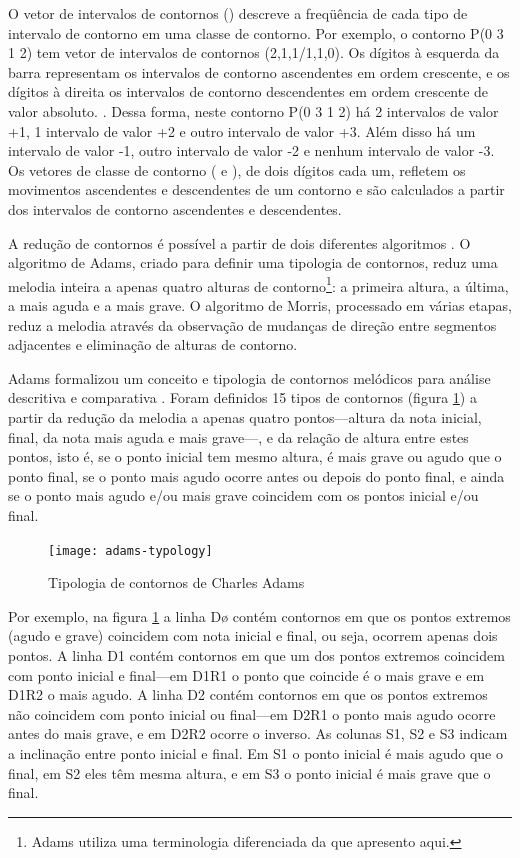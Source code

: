 O vetor de intervalos de contornos () descreve a freqüência de
cada tipo de intervalo de contorno em uma classe de contorno. Por
exemplo, o contorno P(0 3 1 2) tem vetor de intervalos de contornos
(2,1,1/1,1,0). Os dígitos à esquerda da barra representam os
intervalos de contorno ascendentes em ordem crescente, e os dígitos à
direita os intervalos de contorno descendentes em ordem crescente de
valor absoluto. \cite{friedmann85:methodology}. Dessa forma, neste
contorno P(0 3 1 2) há 2 intervalos de valor +1, 1 intervalo de valor
+2 e outro intervalo de valor +3. Além disso há um intervalo de valor
-1, outro intervalo de valor -2 e nenhum intervalo de valor -3. Os
vetores de classe de contorno ( e ), de dois
dígitos cada um, refletem os movimentos ascendentes e descendentes de
um contorno e são calculados a partir dos intervalos de contorno
ascendentes e descendentes.

A redução de contornos é possível a partir de dois diferentes
algoritmos \cite{adams76:melodic,morris93:directions}. O algoritmo de
Adams, criado para definir uma tipologia de contornos, reduz uma
melodia inteira a apenas quatro alturas de contorno\footnote{Adams
  utiliza uma terminologia diferenciada da que apresento aqui.}: a
primeira altura, a última, a mais aguda e a mais grave. O algoritmo de
Morris, processado em várias etapas, reduz a melodia através da
observação de mudanças de direção entre segmentos adjacentes e
eliminação de alturas de contorno.

Adams formalizou um conceito e tipologia de contornos melódicos para
análise descritiva e comparativa \cite{adams76:melodic}. Foram
definidos 15 tipos de contornos (figura \ref{fig:adams-typology}) a
partir da redução da melodia a apenas quatro pontos---altura da nota
inicial, final, da nota mais aguda e mais grave---, e da relação de
altura entre estes pontos, isto é, se o ponto inicial tem mesmo
altura, é mais grave ou agudo que o ponto final, se o ponto mais agudo
ocorre antes ou depois do ponto final, e ainda se o ponto mais agudo
e/ou mais grave coincidem com os pontos inicial e/ou final.

\begin{figure}
  \centering
  \texttt{[image: adams-typology]}
  \caption{Tipologia de contornos de Charles Adams}
  \label{fig:adams-typology}
\end{figure}

Por exemplo, na figura \ref{fig:adams-typology} a linha Dø contém
contornos em que os pontos extremos (agudo e grave) coincidem com nota
inicial e final, ou seja, ocorrem apenas dois pontos. A linha D1
contém contornos em que um dos pontos extremos coincidem com ponto
inicial e final---em D1R1 o ponto que coincide é o mais grave e em
D1R2 o mais agudo. A linha D2 contém contornos em que os pontos
extremos não coincidem com ponto inicial ou final---em D2R1 o ponto
mais agudo ocorre antes do mais grave, e em D2R2 ocorre o inverso. As
colunas S1, S2 e S3 indicam a inclinação entre ponto inicial e
final. Em S1 o ponto inicial é mais agudo que o final, em S2 eles têm
mesma altura, e em S3 o ponto inicial é mais grave que o final.

